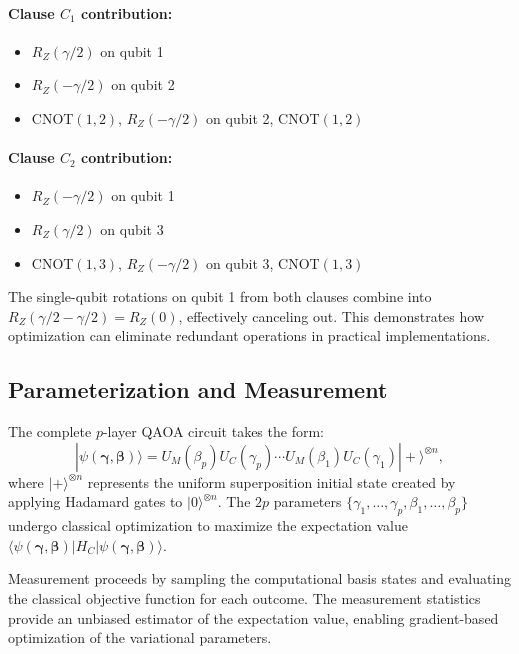 \documentclass[%
 reprint,
 amsmath,amssymb,
 aps,
]{revtex4-2}
\begin{document}
\paragraph{Clause $C_1$ contribution:}
\begin{itemize}
\item $R_Z(\gamma/2)$ on qubit 1
\item $R_Z(-\gamma/2)$ on qubit 2
\item CNOT$(1,2)$, $R_Z(-\gamma/2)$ on qubit 2, CNOT$(1,2)$
\end{itemize}

\paragraph{Clause $C_2$ contribution:}
\begin{itemize}
\item $R_Z(-\gamma/2)$ on qubit 1
\item $R_Z(\gamma/2)$ on qubit 3
\item CNOT$(1,3)$, $R_Z(-\gamma/2)$ on qubit 3, CNOT$(1,3)$
\end{itemize}

The single-qubit rotations on qubit 1 from both clauses combine into $R_Z(\gamma/2 - \gamma/2) = R_Z(0)$, effectively canceling out. This demonstrates how optimization can eliminate redundant operations in practical implementations.

\subsection{Parameterization and Measurement}
\label{subsec:parameters}

The complete $p$-layer QAOA circuit takes the form:
\begin{equation}
|\psi(\boldsymbol{\gamma}, \boldsymbol{\beta})\rangle = U_M(\beta_p)U_C(\gamma_p)\cdots U_M(\beta_1)U_C(\gamma_1)|+\rangle^{\otimes n},
\label{eq:qaoa_circuit}
\end{equation}
where $|+\rangle^{\otimes n}$ represents the uniform superposition initial state created by applying Hadamard gates to $|0\rangle^{\otimes n}$. The $2p$ parameters $\{\gamma_1,\ldots,\gamma_p, \beta_1,\ldots,\beta_p\}$ undergo classical optimization to maximize the expectation value $\langle\psi(\boldsymbol{\gamma}, \boldsymbol{\beta})|H_C|\psi(\boldsymbol{\gamma}, \boldsymbol{\beta})\rangle$.

Measurement proceeds by sampling the computational basis states and evaluating the classical objective function for each outcome. The measurement statistics provide an unbiased estimator of the expectation value, enabling gradient-based optimization of the variational parameters.
\end{document}
